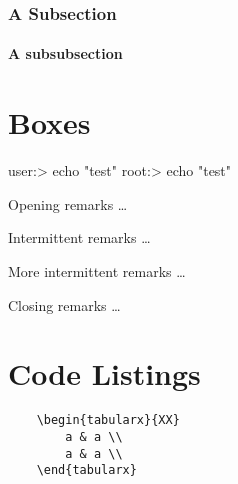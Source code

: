 \documentclass[a4paper,11pt,oneside,showtrims]{alpenthesis}
\begin{document}
\subsection{A Subsection}
\lipsum[1]

\subsubsection{A subsubsection}
\lipsum[2]
\chapter{Boxes} %
\tikzexternaldisable
\begin{tcolorbox}[breakable,title=Breakable Box With Title]
    \lipsum[1-9]
\end{tcolorbox}
\tikzexternalenable

\vspace{1em}

\tikzexternaldisable
\begin{commandshell}
    user:>  echo "test"
    root:> echo "test"
\end{commandshell}
\tikzexternalenable

\vspace{1em}

\tikzexternaldisable
\begin{tcolorbox}[title=Box with title]
    \lipsum[2]
\end{tcolorbox}
\tikzexternalenable

\vspace{1em}

\tikzexternaldisable
\begin{tcolorbox}
    \lipsum[2]
\end{tcolorbox}
\tikzexternalenable

\newpage
\tikzexternaldisable
Opening remarks \ldots
\begin{tcolorbox}[skin=octoboxfirst,title=Some Manually Broken Boxes]
    \lipsum[1]
\end{tcolorbox}
Intermittent remarks \ldots
\begin{tcolorbox}[skin=octoboxmiddle]
    \lipsum[2]
\end{tcolorbox}
More intermittent remarks \ldots
\begin{tcolorbox}[skin=octoboxlast]
    \lipsum[3]
\end{tcolorbox}
Closing remarks \ldots
\tikzexternalenable

\chapter{Code Listings} %
\begin{verbatim}
    \begin{tabularx}{XX}
        a & a \\
        a & a \\
    \end{tabularx}
\end{verbatim}
\end{document}
